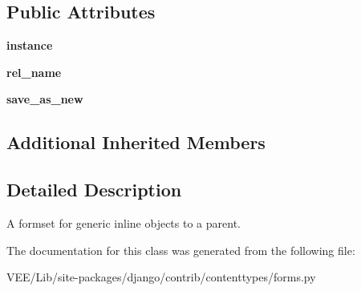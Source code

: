 \subsection*{Public Attributes}
\begin{DoxyCompactItemize}
\item 
\mbox{\label{classdjango_1_1contrib_1_1contenttypes_1_1forms_1_1_base_generic_inline_form_set_a11ad24618e1efc64b697b7f4143c3e50}} 
{\bfseries instance}
\item 
\mbox{\label{classdjango_1_1contrib_1_1contenttypes_1_1forms_1_1_base_generic_inline_form_set_a78d6cbb25fcaa2737234aeab1fc36583}} 
{\bfseries rel\+\_\+name}
\item 
\mbox{\label{classdjango_1_1contrib_1_1contenttypes_1_1forms_1_1_base_generic_inline_form_set_ac77b9fa850a5d02cf801704cc82f492b}} 
{\bfseries save\+\_\+as\+\_\+new}
\end{DoxyCompactItemize}
\subsection*{Additional Inherited Members}


\subsection{Detailed Description}
\begin{DoxyVerb}A formset for generic inline objects to a parent.
\end{DoxyVerb}
 

The documentation for this class was generated from the following file\+:\begin{DoxyCompactItemize}
\item 
V\+E\+E/\+Lib/site-\/packages/django/contrib/contenttypes/forms.\+py\end{DoxyCompactItemize}
